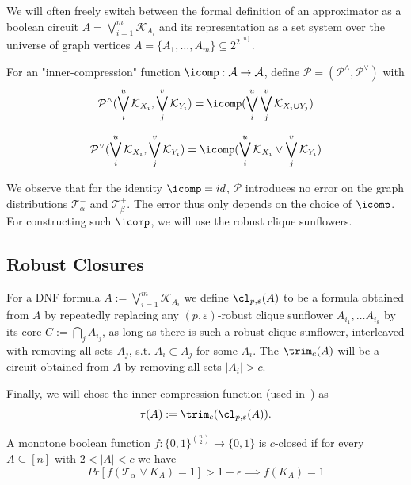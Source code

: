 We will often freely switch between the formal definition of an approximator as a boolean circuit $A = \bigvee_{i=1}^{m} \mathcal{K}_{A_i}$ and its representation as a set system over the universe of graph vertices $A = \{A_1, \dots, A_m\} \subseteq 2^{2^{[n]}}$.

\begin{definition}
    \label{def:approximation-gates}
    For an "inner-compression" function $\icomp: \mathcal{A} \to \mathcal{A}$, define $\mathcal{P} = (\mathcal{P}^\wedge, \mathcal{P}^\vee)$ with
    \begin{equation*}
        \mathcal{P}^\wedge(\bigvee_i^u \mathcal{K}_{X_i}, \bigvee_j^v \mathcal{K}_{Y_i}) = \icomp(\bigvee_i^u \bigvee_j^v \mathcal{K}_{X_i \cup Y_j})
    \end{equation*}

    \begin{equation*}
        \mathcal{P}^\vee(\bigvee_i^u \mathcal{K}_{X_i}, \bigvee_j^v \mathcal{K}_{Y_i}) = \icomp(\bigvee_i^u \mathcal{K}_{X_i} \vee \bigvee_j^v \mathcal{K}_{Y_i})
    \end{equation*}
\end{definition}

We observe that for the identity $\icomp = id$, $\mathcal{P}$ introduces no error on the graph distributions $\mathcal{T}^-_\alpha$ and $\mathcal{T}^+_\beta$. The error thus only depends on the choice of $\icomp$. For constructing such $\icomp$, we will use the robust clique sunflowers.

\subsection{Robust Closures}
For a DNF formula $A := \bigvee_{i=1}^m \mathcal{K}_{A_i}$ we define $\cl_{p, \varepsilon}(A)$ to be a formula obtained from $A$ by repeatedly replacing any $(p, \varepsilon)$-robust clique sunflower $A_{i_1}, \ldots A_{i_k}$ by its core $C := \bigcap_{j} A_{i_j}$, as long as there is such a robust clique sunflower, interleaved with removing all sets $A_j$, s.t. $A_i \subset A_j$ for some $A_i$. The $\trim_c(A)$ will be a circuit obtained from $A$ by removing all sets $|A_{i}| > c$.

Finally, we will chose the inner compression function (used in~) as 
\begin{equation*}
    \tau(A) := \trim_c(\cl_{p, \varepsilon}(A)).
\end{equation*}

\iffalse
\begin{definition}
    A monotone boolean function $f: \{0, 1\}^{\binom{n}{2}} \rightarrow \{0, 1\}$ is $c$-closed if for every $A \subseteq [n]$ with $2 < |A| < c$ we have
    $$Pr[f(\mathcal{T}^-_\alpha \vee K_A) = 1] > 1 - \epsilon \implies f(K_A) = 1$$
\end{definition}

